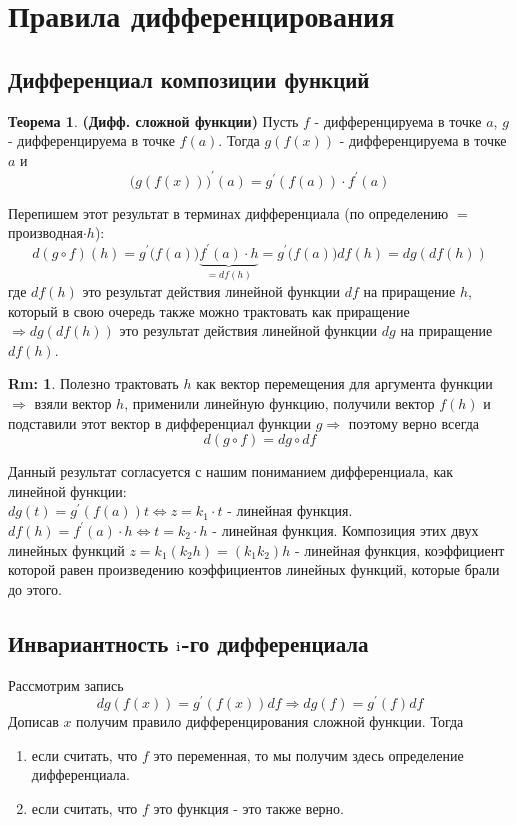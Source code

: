 \documentclass[12pt]{article}
\newcommand{\RN}[1]{%
	\textup{\uppercase\expandafter{\romannumeral#1}}%
}
\theoremstyle{definition}
\newtheorem{rem}{Rm:}
\newtheorem{theorem}{Теорема}
\begin{document}

\section*{Правила дифференцирования}

\subsection*{Дифференциал композиции функций}
\begin{theorem}\textbf{(Дифф. сложной функции)}
	Пусть $f$ - дифференцируема в точке $a$, $g$ - дифференцируема в точке $f(a)$. Тогда $g(f(x))$ - дифференцируема в точке $a$ и $$\big( g(f(x))\big)^\prime(a) = g^\prime(f(a)){\cdot}f^\prime(a)$$
\end{theorem}

Перепишем этот результат в терминах дифференциала (по определению $=$ производная$\cdot h$): 
$$d(g\circ f)(h) = g^\prime\big(f(a) \big)\underbrace{f^\prime(a){\cdot}h}_{=df(h)} = g^\prime\big(f(a) \big)df(h) = dg(df(h))$$ 
где $df(h)$ это результат действия линейной функции $df$ на приращение $h$, который в свою очередь также можно трактовать как приращение $\Rightarrow dg(df(h))$ это результат действия линейной функции $dg$ на приращение $df(h)$. 
\begin{rem}
	Полезно трактовать $h$ как вектор перемещения для аргумента функции $\Rightarrow$ взяли вектор $h$, применили линейную функцию, получили вектор $f(h)$ и подставили этот вектор в дифференциал функции $g \Rightarrow$ поэтому верно всегда
	$$d(g \circ f) = dg \circ df$$
\end{rem}

Данный результат согласуется с нашим пониманием дифференциала, как линейной функции:\\
$dg(t) = g^\prime(f(a))t \Leftrightarrow z = k_1{\cdot}t$ - линейная функция. $df(h) = f^\prime(a){\cdot}h \Leftrightarrow t = k_2{\cdot}h$ - линейная функция. Композиция этих двух линейных функций $z = k_1(k_2h) = (k_1k_2)h$ - линейная функция, коэффициент которой равен произведению коэффициентов линейных функций, которые брали до этого. 

\subsection*{Инвариантность $\RN{1}$-го дифференциала}

Рассмотрим запись
$$dg(f(x)) = g^\prime(f(x))df \Rightarrow dg(f) = g^\prime(f)df$$ 
Дописав $x$ получим правило дифференцирования сложной функции. Тогда
\begin{enumerate}
	\item если считать, что $f$ это переменная, то мы получим здесь определение дифференциала. 
	\item если считать, что $f$ это функция - это также верно. 
\end{enumerate}
\end{document}
